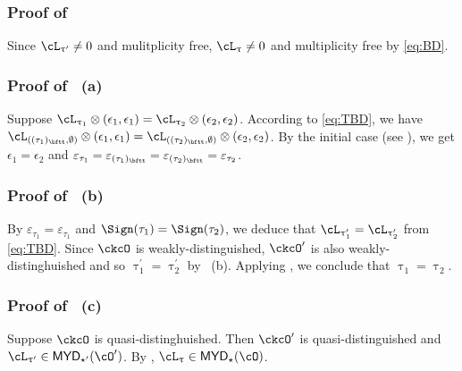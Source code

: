 \documentclass[12pt,a4paper]{amsart}
\def\MYD{{\mathsf{MYD}}}
\numberwithin{equation}{section}
\theoremstyle{remark}
\def\uptaup{\uptau^{\prime}}
\begin{document}
\subsubsection*{Proof of }

Since $\ac_{\uptau'}\neq 0$ and mulitplicity free,  $\ac_{\uptau}\neq 0$ and
multiplicity free by \eqref{eq:BD}.


\subsubsection*{Proof of ~(a)}
Suppose $\ac_{\uptau_1}\lotimes (\epsilon_{1},\epsilon_{1})
= \ac_{\uptau_2}\lotimes( \epsilon_{2},\epsilon_{2} )$.
According to \eqref{eq:TBD}, we have 
$\cL_{((\tau_{1})_{\bftt},\emptyset)}\lotimes(\epsilon_{1},\epsilon_{1}) =
\cL_{((\tau_{2})_{\bftt},\emptyset)}\lotimes(\epsilon_{2},\epsilon_{2})$.
By the  initial case (see ), we get $\epsilon_{1}=\epsilon_{2}$ and
$\varepsilon_{\tau_{1}}=\varepsilon_{(\tau_{1})_{\bftt}}=\varepsilon_{(\tau_{2})_{\bftt}}=\varepsilon_{\tau_{2}}$.


\subsubsection*{Proof of ~(b)} 

By $\varepsilon_{\tau_1} = \varepsilon_{\tau_1}$ and
$\Sign(\tau_1)=\Sign(\tau_2)$, we deduce that
$\ac_{\uptaup_{1}}=\ac_{\uptaup_{2}}$ from  \eqref{eq:TBD}. Since $\ckcO$ is
weakly-distinguished, $\ckcO'$ is also weakly-distinghuished and so
$\uptaup_{1}=\uptaup_{2}$ by ~(b). Applying , we
conclude that $\uptau_{1}=\uptau_{2}$. 

\subsubsection*{Proof of ~(c)}

Suppose $\ckcO$ is quasi-distinghuished.
Then $\ckcO'$ is quasi-distinguished and $\ac_{\uptau'}\in \MYD_{\star'}(\cO')$. 
By , $\ac_{\uptau}\in \MYD_{\star}(\cO)$.

\end{document}
